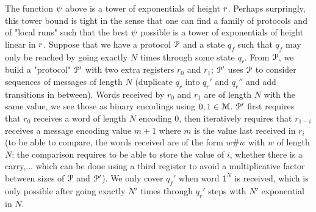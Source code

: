 \begin{remark}
	The function $\psi$ above is a tower of exponentials of height $r$. Perhaps surpringly, this tower bound is tight in the sense that one can find a family of protocols and of "local runs" such that the best $\psi$ possible is a tower of exponentials of height linear in $r$. Suppose that we have a protocol $\mathcal{P}$ and a state $q_f$ such that $q_f$ may only be reached by going exactly $N$ times through some state $q_r$. From $\mathcal{P}$, we build a "protocol" $\mathcal{P}'$ with two extra registers $r_0$ and $r_1$; $\mathcal{P}'$ uses $\mathcal{P}$ to consider sequences of messages of length $N$ (duplicate $q_r$ into $q_r'$ and $q_r''$ and add transitions in between). Words received by $r_0$ and $r_1$ are of length $N$ with the same value, we see those as binary encodings using $\mathsf{0}, \mathsf{1} \in \messages$. $\mathcal{P}'$ first requires that $r_0$ receives a word of length $N$ encoding $0$, then iteratively requires that $r_{1-i}$ receives a message encoding value $m+1$ where $m$ is the value last received in $r_i$ (to be able to compare, the words received are of the form $w \#w$ with $w$ of length $N$; the comparison requires to be able to store the value of $i$, whether there is a carry,... which can be done using a third register to avoid a multiplicative factor between sizes of $\mathcal{P}$ and $\mathcal{P}'$). We only cover $q_f'$ when word $\mathsf{1}^N$ is received, which is only possible after going exactly $N'$ times through $q_r'$ steps with $N'$ exponential in $N$.
\end{remark}



